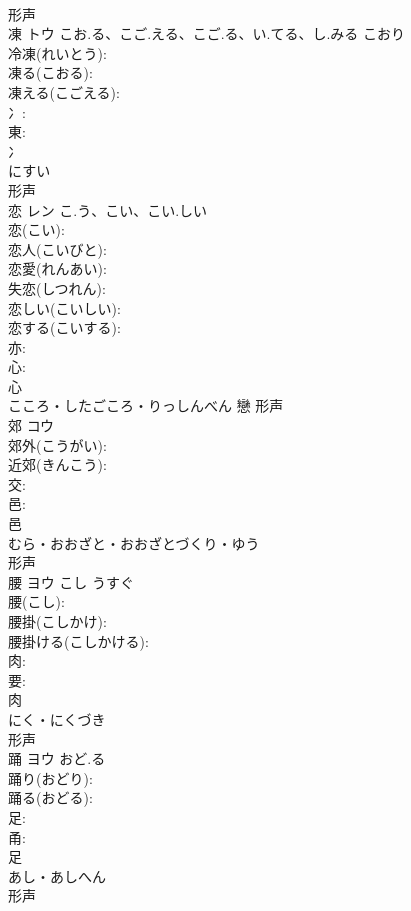 \documentclass[8pt]{extreport}
\begin{document}
\begin{CJK}{UTF8}{min}
\\	形声 
\\	凍	トウ	こお.る、こご.える、こご.る、い.てる、し.みる	こおり	
\\	冷凍(れいとう): 
\\	凍る(こおる): 
\\	凍える(こごえる): 
\\	冫: 
\\	東: 
\\	冫	
\\	にすい	
\\	形声 
\\	恋	レン	こ.う、こい、こい.しい		
\\	恋(こい): 
\\	恋人(こいびと): 
\\	恋愛(れんあい): 
\\	失恋(しつれん): 
\\	恋しい(こいしい): 
\\	恋する(こいする): 
\\	亦: 
\\	心: 
\\	心	
\\	こころ・したごころ・りっしんべん	戀	形声 
\\	郊	コウ			
\\	郊外(こうがい): 
\\	近郊(きんこう): 
\\	交: 
\\	邑: 
\\	邑	
\\	むら・おおざと・おおざとづくり・ゆう	
\\	形声 
\\	腰	ヨウ	こし	うすぐ	
\\	腰(こし): 
\\	腰掛(こしかけ): 
\\	腰掛ける(こしかける): 
\\	肉: 
\\	要: 
\\	肉	
\\	にく・にくづき	
\\	形声 
\\	踊	ヨウ	おど.る		
\\	踊り(おどり): 
\\	踊る(おどる): 
\\	足: 
\\	甬: 
\\	足	
\\	あし・あしへん	
\\	形声 

\end{CJK}
\end{document}
